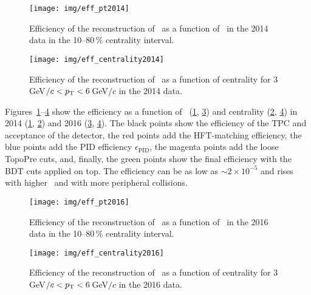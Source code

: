 \begin{figure}[!p]
\centering
\texttt{[image: img/eff\_pt2014]}
\caption[Efficiency of the reconstruction of \Lambdac\ as a function of \pt\ in the 2014.]{\label{eff_pt2014} Efficiency of the reconstruction of \Lambdac\ as a function of \pt\ in the 2014 data in the 10--80$\,\%$ centrality interval.}
\end{figure}

\begin{figure}[!p]
\centering
\texttt{[image: img/eff\_centrality2014]}
\caption[ Efficiency of the reconstruction of \Lambdac\ as a function of centrality in the 2014 data.]{\label{eff_centrality2014} Efficiency of the reconstruction of \Lambdac\ as a function of centrality for $3\,$GeV$/c < {p_{\mathrm{T}}} < 6\,$GeV$/c$ in the 2014 data.}
\end{figure}



Figures~\ref{eff_pt2014}--\ref{eff_centrality2016} show the efficiency as a function of \pt\ (\ref{eff_pt2014}, \ref{eff_pt2016}) and centrality (\ref{eff_centrality2014}, \ref{eff_centrality2016}) in 2014 (\ref{eff_pt2014}, \ref{eff_centrality2014}) and 2016 (\ref{eff_pt2016}, \ref{eff_centrality2016}). The black points show the efficiency of the TPC and acceptance of the detector, the red points add the HFT-matching efficiency, the blue points add the PID efficiency $\epsilon_\mathrm{PID}$, the magenta points add the loose TopoPre cuts, and, finally, the green points show the final efficiency with the BDT cuts applied on top. The efficiency can be as low as $\sim2\times10^{-5}$ and rises with higher \pt\ and with more peripheral collisions.

\begin{figure}[!p]
\centering
\texttt{[image: img/eff\_pt2016]}
\caption{\label{eff_pt2016} Efficiency of the reconstruction of \Lambdac\ as a function of \pt\ in the 2016 data in the 10--80$\,\%$ centrality interval.}
\end{figure}

\begin{figure}[!p]
\centering
\texttt{[image: img/eff\_centrality2016]}
\caption[Efficiency of the reconstruction of \Lambdac\ as a function of centrality in the 2016 data.]{\label{eff_centrality2016} Efficiency of the reconstruction of \Lambdac\ as a function of centrality for $3\,$GeV$/c < {p_{\mathrm{T}}} < 6\,$GeV$/c$ in the 2016 data.}
\end{figure}

